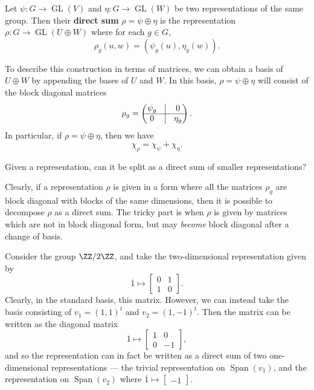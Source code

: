 \begin{definition}
Let $\psi: G \to \operatorname{GL}(V)$ and $\eta: G \to \operatorname{GL}(W)$ be two representations of the same group. Then their \textbf{direct sum} $\rho = \psi \oplus \eta$ is the representation $\rho: G \to \operatorname{GL}(U \oplus W)$ where for each $g \in G$, \[\rho_g(u, w) = (\psi_g(u), \eta_g(w)).\] 
\end{definition}

To describe this construction in terms of matrices, we can obtain a basis of $U \oplus W$ by appending the bases of $U$ and $W$. In this basis, $\rho = \psi \oplus \eta$ will consist of the block diagonal matrices \[\rho_g = \begin{pmatrix}\psi_g & \vline & 0 \\ \hline 0 & \vline & \eta_g \end{pmatrix}.\] In particular, if $\rho = \psi \oplus \eta$, then we have \[\chi_\rho = \chi_{\psi} + \chi_\eta.\] 

\begin{qq}
Given a representation, can it be split as a direct sum of smaller representations?
\end{qq}

Clearly, if a representation $\rho$ is given in a form where all the matrices $\rho_g$ are block diagonal with blocks of the same dimensions, then it is possible to decompose $\rho$ as a direct sum. The tricky part is when $\rho$ is given by matrices which are not in block diagonal form, but may \emph{become} block diagonal after a change of basis.

\begin{example}\label{2d rep}
Consider the group $\ZZ/2\ZZ$, and take the two-dimensional representation given by \[\overline{1} \mapsto \begin{bmatrix} 0 & 1 \\ 1 & 0 \end{bmatrix}.\] Clearly, in the standard basis, this matrix. However, we can instead take the basis consisting of $v_1 = (1, 1)^t$ and $v_2 = (1, -1)^t$. Then the matrix can be written as the diagonal matrix 
\[\overline{1} \mapsto \begin{bmatrix}1 & 0 \\ 0 & -1 \end{bmatrix},\] and so the representation can in fact be written as a direct sum of two one-dimensional representations --- the trivial representation on $\operatorname{Span}(v_1)$, and the representation on $\operatorname{Span}(v_2)$ where $\overline{1} \mapsto \begin{bmatrix}-1 \end{bmatrix}$. 
\end{example}

